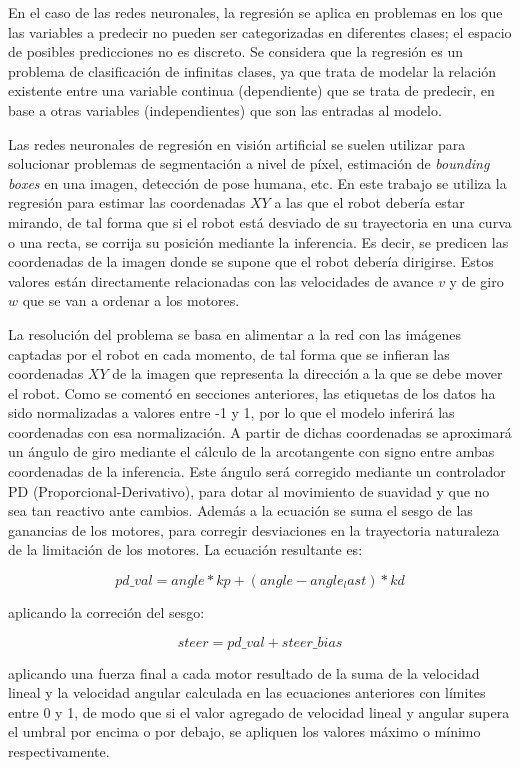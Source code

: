 En el caso de las redes neuronales, la regresión se aplica en problemas en los que las variables a predecir no pueden ser categorizadas en diferentes clases; el espacio de posibles predicciones no es discreto. Se considera que la regresión es un problema de clasificación de infinitas clases, ya que trata de modelar la relación existente entre una variable continua (dependiente) que se trata de predecir, en base a otras variables (independientes) que son las entradas al modelo.

Las redes neuronales de regresión en visión artificial se suelen utilizar para solucionar problemas de segmentación a nivel de píxel, estimación de \textit{bounding boxes} en una imagen, detección de pose humana, etc. En este trabajo se utiliza la regresión para estimar las coordenadas $XY$ a las que el robot debería estar mirando, de tal forma que si el robot está desviado de su trayectoria en una curva o una recta, se corrija su posición mediante la inferencia. Es decir, se predicen las coordenadas de la imagen donde se supone que el robot debería dirigirse. Estos valores están directamente relacionadas con las velocidades de avance $v$ y de giro $w$ que se van a ordenar a los motores.

La resolución del problema se basa en alimentar a la red con las imágenes captadas por el robot en cada momento, de tal forma que se infieran las coordenadas $XY$ de la imagen que representa la dirección a la que se debe mover el robot. Como se comentó en secciones anteriores, las etiquetas de los datos ha sido normalizadas a valores entre -1 y 1, por lo que el modelo inferirá las coordenadas con esa normalización. A partir de dichas coordenadas se aproximará un ángulo de giro mediante el cálculo de la arcotangente con signo entre ambas coordenadas de la inferencia. Este ángulo será corregido mediante un controlador PD (Proporcional-Derivativo), para dotar al movimiento de suavidad y que no sea tan reactivo ante cambios. Además a la ecuación se suma el sesgo de las ganancias de los motores, para corregir desviaciones en la trayectoria naturaleza de la limitación de los motores. La ecuación resultante es:

$$
pd\_val = angle * kp + (angle - angle_last) * kd
$$

\noindent aplicando la correción del sesgo:

$$
steer = pd\_val + steer\_bias
$$

\noindent aplicando una fuerza final a cada motor resultado de la suma de la velocidad lineal y la velocidad angular calculada en las ecuaciones anteriores con límites entre 0 y 1, de modo que si el valor agregado de velocidad lineal y angular supera el umbral por encima o por debajo, se apliquen los valores máximo o mínimo respectivamente.

